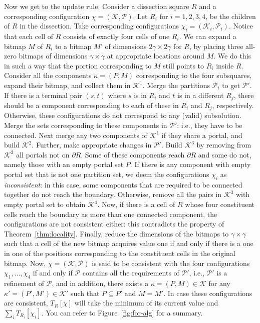 \documentclass[extras,11pt]{article} \usepackage{fullpage}
\theoremstyle{mytheorem}
\begin{document}
Now we get to the update rule.
Consider a dissection square $R$ and a corresponding configuration $\chi=(\mathcal{K},\mathcal{P})$.
Let $R_i$ for $i=1,2,3,4$, be the children of $R$ in the dissection.
Take corresponding configurations $\chi_i=(\mathcal{K}_i,\mathcal{P}_i)$.
Notice that each cell of $R$ consists of exactly four cells of one $R_i$.
We can expand a bitmap $M$ of $R_i$ to a bitmap $M'$ of dimensions $2\gamma\times 2\gamma$ for $R$,
by placing three all-zero bitmaps of dimensions $\gamma\times\gamma$ at appropriate locations around $M$.
We do this in such a way that the portion corresponding to $M$ still points to $R_i$ inside $R$.
Consider all the components $\kappa=(P,M)$ corresponding to the four subsquares, expand their bitmap, and collect them in $\mathcal{K}^1$.
Merge the partitions $\mathcal{P}_i$ to get $\mathcal{P}'$.
If there is a terminal pair $(s,t)$ where $s$ is in $R_i$ and $t$ is in a different $R_j$,
there should be a component corresponding to each of these in $R_i$ and $R_j$, respectively.
Otherwise, these configurations do not correspond to any (valid) subsolution.
Merge the sets corresponding to these components in $\mathcal{P}'$: i.e., they have to be connected.
Next merge any two components of $\mathcal{K}^1$ if they share a portal, and build $\mathcal{K}^2$.
Further, make appropriate changes in $\mathcal{P}'$.
Build  $\mathcal{K}^3$ by removing from $\mathcal{K}^2$ all portals not on $\partial R$.
Some of these components reach $\partial R$ and some do not, namely those with an empty portal set $P$.
If there is any component with empty portal set that is not  one partition set,
we deem the configurations $\chi_i$ as \emph{inconsistent}:
in this case, some components that are required to be connected together do not reach the boundary.
Otherwise, remove all the pairs in $\mathcal{K}^3$ with empty portal set to obtain $\mathcal{K}^4$.
Now, if there is a cell of $R$ whose four constituent cells reach the boundary as more than one connected component, the configurations are not consistent either: this contradicts the property of Theorem~\ref{thm:locality}.
Finally, reduce the dimensions of the bitmaps to $\gamma\times\gamma$ such that a cell of the new bitmap acquires value one if and only if there is a one in one of the positions corresponding to the constituent cells in the original bitmap.
Now, $\chi = (\mathcal{K}, \mathcal{P})$ is said to be consistent with the four configurations $\chi_1,\dots,\chi_4$ if and only if $\mathcal{P}$ contains all the requirements of $\mathcal{P}'$, i.e., $\mathcal{P}'$ is a refinement of $\mathcal{P}$, and in addition, there exists a $\kappa=(P,M)\in\mathcal{K}$ for any $\kappa'=(P',M')\in\mathcal{K}'$ such that $P\subseteq P'$ and $M = M'$.  In case these configurations are consistent,
 $T_R[\chi]$ will take the minimum of its current value and $\sum_i T_{R_i}[\chi_i]$.
You can refer to Figure~\ref{fig:for-alg} for a summary.
\end{document}
